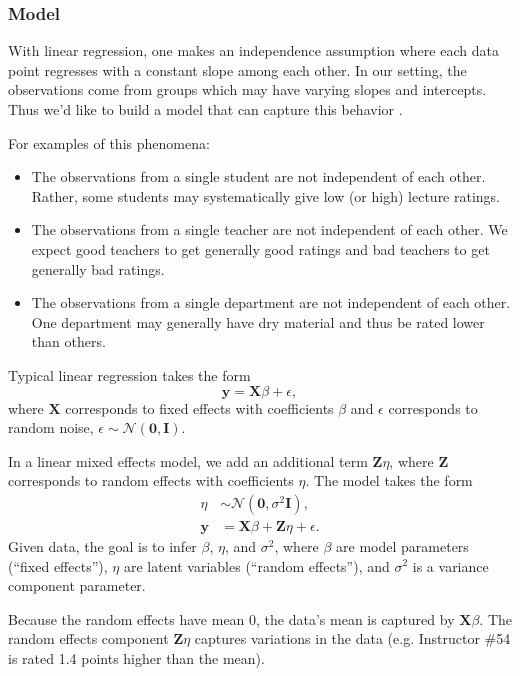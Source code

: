 \subsubsection{Model}

With linear regression, one makes an independence assumption where
each data point regresses with a constant slope among each other. In
our setting, the observations come from groups which may have
varying slopes and intercepts. Thus we'd like to build a model that
can capture this behavior \citep{gelman2006data}.

For examples of this phenomena:
\begin{itemize}
\item The observations from a single student are not independent of
each other. Rather, some students may systematically give low (or
high) lecture ratings.
\item The observations from a single teacher are not independent of
each other. We expect good teachers to get generally good ratings and
bad teachers to get generally bad ratings.
\item The observations from a single department are not independent of
each other. One department may generally have dry material and thus be
rated lower than others.
\end{itemize}

Typical linear regression takes the form
\begin{equation*}
\mathbf{y} = \mathbf{X}\beta + \epsilon,
\end{equation*}
where $\mathbf{X}$ corresponds to fixed effects with coefficients
$\beta$ and $\epsilon$ corresponds to random noise,
$\epsilon\sim\mathcal{N}(\mathbf{0}, \mathbf{I})$.

In a linear mixed effects model, we add an additional term
$\mathbf{Z}\eta$, where $\mathbf{Z}$ corresponds to random effects
with coefficients $\eta$. The model takes the form
\begin{align*}
\eta &\sim \mathcal{N}(\mathbf{0}, \sigma^2 \mathbf{I}), \\
\mathbf{y} &= \mathbf{X}\beta + \mathbf{Z}\eta + \epsilon.
\end{align*}
Given data, the goal is to infer $\beta$, $\eta$, and $\sigma^2$,
where $\beta$ are model parameters (``fixed effects''), $\eta$ are
latent variables (``random effects''), and $\sigma^2$ is a variance
component parameter.

Because the random effects have mean 0, the data's mean is captured by
$\mathbf{X}\beta$. The random effects component $\mathbf{Z}\eta$
captures variations in the data (e.g.  Instructor \#54 is rated 1.4
points higher than the mean).

